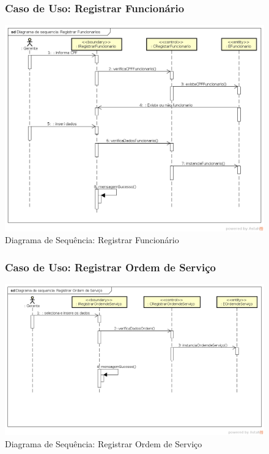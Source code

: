 \documentclass[
	12pt,				%
	openright,
	oneside,			%
	a4paper,			%
	chapter=TITLE,		%
	brazil				%
	]{abntex2}
\begin{document}
\begin{figure}[h!]

\subsubsection*{Caso de Uso: Registrar Funcionário}


	\caption{Diagrama de Sequência: Registrar Funcionário}
	\begin{center}
	    \includegraphics[scale=0.5]{Arquivos/Projeto/D_registrar_funcionario}  
	\end{center}
\end{figure}







\begin{figure}[h!]

\subsubsection*{Caso de Uso: Registrar Ordem de Serviço}


	\caption{Diagrama de Sequência: Registrar Ordem de Serviço}
	\begin{center}
	    \includegraphics[scale=0.5]{Arquivos/Projeto/D_registrar_ordem_servico}  
	\end{center}
\end{figure}
\end{document}
